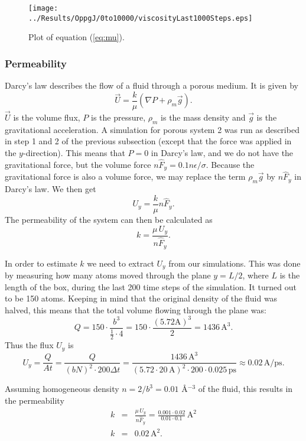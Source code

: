\documentclass[12pt]{article}
\newcommand{\bdi}{\begin{displaymath}}
\newcommand{\edi}{\end{displaymath}}
\begin{document}
\begin{figure}[!ht]
    \begin{center}
	\texttt{[image: ../Results/OppgJ/0to10000/viscosityLast1000Steps.eps]}
	\caption{Plot of equation (\ref{eq:mu}).}
	\label{fig:mu}
    \end{center}
\end{figure}



\subsubsection{Permeability}
Darcy's law describes the flow of a fluid through a porous medium. It is given by
\bdi
\vec U = \frac{k}{\mu}(\nabla P + \rho_m\vec g).
\edi
$\vec U$ is the volume flux, $P$ is the pressure, $\rho_m$ is the mass density and $\vec g$ is the gravitational acceleration. A simulation for porous system 2 was run as described in step 1 and 2
of the previous subsection (except that the force was applied in the $y$-direction). This means that $P=0$ in Darcy's law, and we do not have the gravitational force, but the volume force $n\hat F_y = 0.1n\epsilon/\sigma$.
Because the gravitational force is also a volume force, we may replace the term $\rho_m \vec g$ by $n\hat F_y$ in Darcy's law. We then get
\bdi
U_y = \frac{k}{\mu}n\hat F_y.
\edi
The permeability of the system can then be calculated as
\bdi
k = \frac{\mu\,U_y}{n\hat F_y}.
\edi

In order to estimate $k$ we need to extract $U_y$ from our simulations. This was done by measuring how many atoms moved through the plane $y = L/2$, where $L$ is the length of the box, during the last 200
time steps of the simulation. It turned out to be 150 atoms. Keeping in mind that the original density of the fluid was halved, this means that the total volume flowing through the plane was:
\bdi
Q = 150\cdot\frac{b^3}{\frac{1}{2}\cdot4} = 150\cdot\frac{(5.72\mathrm{A})^3}{2} = 1436\,\mathrm{A}^3.
\edi
Thus the flux $U_y$ is
\bdi
U_y = \frac{Q}{At} = \frac{Q}{(bN)^2\cdot200\Delta t} = \frac{1436\,\mathrm{A}^3}{(5.72\cdot20\,\mathrm{A})^2\cdot200\cdot0.025\,\mathrm{ps}} \approx 0.02\,\mathrm{A/ps}.
\edi

Assuming homogeneous density $n = 2/b^3 = 0.01$ Å$^{-3}$ of the fluid, this results in the permeability
\begin{eqnarray*}
k & = & \frac{\mu\,U_y}{n\hat F_y} = \frac{0.001\cdot0.02}{0.01\cdot 0.1}\,\mathrm{A}^2 \\
k & = & 0.02\,\mathrm{A}^2.
\end{eqnarray*}
\end{document}
